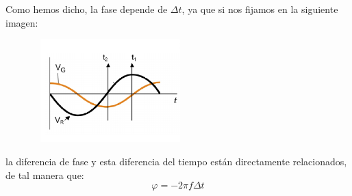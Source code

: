 \documentclass[10pt,a4paper]{article}
\begin{document}
Como hemos dicho, la fase depende de $\Delta t$, ya que si nos fijamos en la siguiente imagen: 
\begin{figure}[htb]
\center
\includegraphics[width=6cm, height=4cm]{Desfase}
\label{Desfase}

\end{figure}

la diferencia de fase y esta diferencia del tiempo están directamente relacionados, de tal manera que:
\begin{equation}
\label{Desfase en grados}
\varphi = -2 \pi f \Delta t
\end{equation}
\end{document}
